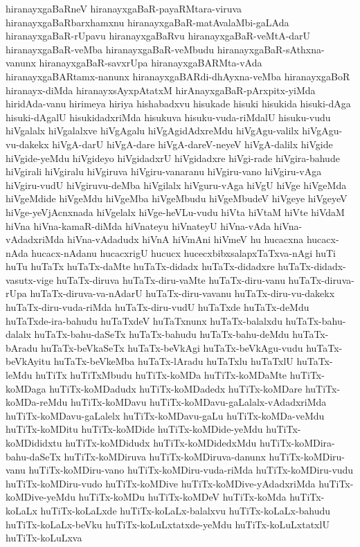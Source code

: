{hiranayxgaBaRneV
hiranayxgaBaR-payaRMtara-viruva
hiranayxgaBaRbarxhamxnu
hiranayxgaBaR-matAvalaMbi-gaLAda
hiranayxgaBaR-rUpavu
hiranayxgaBaRvu
hiranayxgaBaR-veMtA-darU
hiranayxgaBaR-veMba
hiranayxgaBaR-veMbudu
hiranayxgaBaR-sAthxna-vanunx
hiranayxgaBaR-savxrUpa
hiranayxgaBARMta-vAda
hiranayxgaBARtamx-nanunx
hiranayxgaBARdi-dhAyxna-veMba
hiranayxgaBoR
hiranayx-diMda
hiranayxsAyxpAtatxM
hirAnayxgaBaR-pArxpitx-yiMda
hiridAda-vanu
hirimeya
hiriya
hishabadxvu
hisukade
hisuki
hisukida
hisuki-dAga
hisuki-dAgalU
hisukidadxriMda
hisukuva
hisuku-vuda-riMdalU
hisuku-vudu
hiVgalalx
hiVgalalxve
hiVgAgalu
hiVgAgidAdxreMdu
hiVgAgu-valilx
hiVgAgu-vu-dakekx
hiVgA-darU
hiVgA-dare
hiVgA-dareV-neyeV
hiVgA-dalilx
hiVgide
hiVgide-yeMdu
hiVgideyo
hiVgidadxrU
hiVgidadxre
hiVgi-rade
hiVgira-bahude
hiVgirali
hiVgiralu
hiVgiruva
hiVgiru-vanaranu
hiVgiru-vano
hiVgiru-vAga
hiVgiru-vudU
hiVgiruvu-deMba
hiVgilalx
hiVguru-vAga
hiVgU
hiVge
hiVgeMda
hiVgeMdide
hiVgeMdu
hiVgeMba
hiVgeMbudu
hiVgeMbudeV
hiVgeye
hiVgeyeV
hiVge-yeVjAcnxnada
hiVgelalx
hiVge-heVLu-vudu
hiVta
hiVtaM
hiVte
hiVdaM
hiVna
hiVna-kamaR-diMda
hiVnateyu
hiVnateyU
hiVna-vAda
hiVna-vAdadxriMda
hiVna-vAdadudx
hiVnA
hiVmAni
hiVmeV
hu
hucacxna
hucacx-nAda
hucacx-nAdanu
hucacxrigU
hucucx
hucecxbibxsalapxTaTxva-nAgi
huTi
huTu
huTaTx
huTaTx-daMte
huTaTx-didadx
huTaTx-didadxre
huTaTx-didadx-vasutx-vige
huTaTx-diruva
huTaTx-diru-vaMte
huTaTx-diru-vanu
huTaTx-diruva-rUpa
huTaTx-diruva-va-nAdarU
huTaTx-diru-vavanu
huTaTx-diru-vu-dakekx
huTaTx-diru-vuda-riMda
huTaTx-diru-vudU
huTaTxde
huTaTx-deMdu
huTaTxde-ira-bahudu
huTaTxdeV
huTaTxnunx
huTaTx-balalxdu
huTaTx-bahu-dalalx
huTaTx-bahu-daSeTx
huTaTx-bahudu
huTaTx-bahu-deMdu
huTaTx-bAradu
huTaTx-beVkaSeTx
huTaTx-beVkAgi
huTaTx-beVkAgu-vudu
huTaTx-beVkAyitu
huTaTx-beVkeMba
huTaTx-lAradu
huTaTxlu
huTaTxlU
huTaTx-leMdu
huTiTx
huTiTxMbudu
huTiTx-koMDa
huTiTx-koMDaMte
huTiTx-koMDaga
huTiTx-koMDadudx
huTiTx-koMDadedx
huTiTx-koMDare
huTiTx-koMDa-reMdu
huTiTx-koMDavu
huTiTx-koMDavu-gaLalalx-vAdadxriMda
huTiTx-koMDavu-gaLalelx
huTiTx-koMDavu-gaLu
huTiTx-koMDa-veMdu
huTiTx-koMDitu
huTiTx-koMDide
huTiTx-koMDide-yeMdu
huTiTx-koMDididxtu
huTiTx-koMDidudx
huTiTx-koMDidedxMdu
huTiTx-koMDira-bahu-daSeTx
huTiTx-koMDiruva
huTiTx-koMDiruva-danunx
huTiTx-koMDiru-vanu
huTiTx-koMDiru-vano
huTiTx-koMDiru-vuda-riMda
huTiTx-koMDiru-vudu
huTiTx-koMDiru-vudo
huTiTx-koMDive
huTiTx-koMDive-yAdadxriMda
huTiTx-koMDive-yeMdu
huTiTx-koMDu
huTiTx-koMDeV
huTiTx-koMda
huTiTx-koLaLx
huTiTx-koLaLxde
huTiTx-koLaLx-balalxvu
huTiTx-koLaLx-bahudu
huTiTx-koLaLx-beVku
huTiTx-koLuLxtatxde-yeMdu
huTiTx-koLuLxtatxlU
huTiTx-koLuLxva
}
